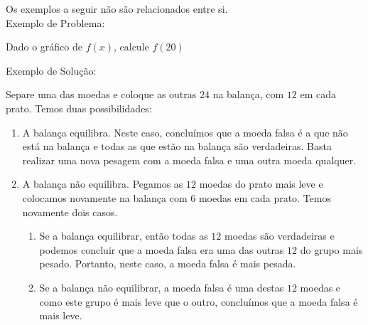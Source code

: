 

\pagestyle{empty}

Os exemplos a seguir não são relacionados entre si.
\\

Exemplo de Problema:
\begin{prob}
    Dado o gráfico de $f\left( x\right)$, calcule $f\left( 20\right)$


\end{prob}


Exemplo de Solução:
\begin{solu}
    Separe uma das moedas e coloque as outras $24$ na balança, com $12$ em cada prato. Temos duas possibilidades:
    \begin{enumerate}[(1)]
        \item
            A balança equilibra. Neste caso, concluímos que a moeda falsa é a que não está na balança e todas as que estão na balança são verdadeiras. Basta realizar uma nova pesagem com a moeda falsa e uma outra moeda qualquer.
        \item
            A balança não equilibra. Pegamos as $12$ moedas do prato mais leve e colocamos novamente na balança com $6$ moedas em cada prato. Temos novamente dois casos.
        \begin{enumerate}
            \item
                Se a balança equilibrar, então todas as $12$ moedas são verdadeiras e podemos  concluir que a moeda falsa era uma das outras $12$ do grupo mais pesado. Portanto, neste caso, a moeda  falsa é mais pesada.
            \item
                Se a balança não equilibrar, a moeda falsa é uma destas $12$ moedas e como este grupo é mais leve que o outro, concluímos que a moeda falsa é mais leve.
        \end{enumerate}
    \end{enumerate}
\end{solu}

